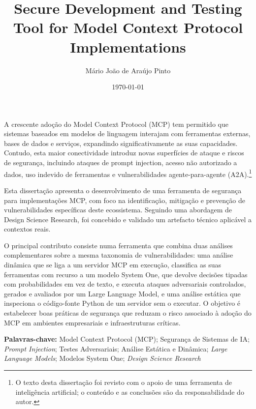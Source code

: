 \documentclass[a4paper,12pt,twoside]{book}
\title{ Secure Development and Testing Tool for Model Context Protocol
Implementations}
\author{Mário João de Araújo Pinto}
\date{\today}
\begin{document}
\maketitle

\begin{resumo}
A crescente adoção do Model Context Protocol (MCP) tem permitido que sistemas baseados em modelos de linguagem interajam com ferramentas externas, bases de dados e serviços, expandindo significativamente as suas capacidades. Contudo, esta maior conectividade introduz novas superfícies de ataque e riscos de segurança, incluindo ataques de prompt injection, acesso não autorizado a dados, uso indevido de ferramentas e vulnerabilidades agente-para-agente (A2A).\footnote{O texto desta dissertação foi revisto com o apoio de uma ferramenta de inteligência artificial; o conteúdo e as conclusões são da responsabilidade do autor.}

Esta dissertação apresenta o desenvolvimento de uma ferramenta de segurança para implementações MCP, com foco na identificação, mitigação e prevenção de vulnerabilidades específicas deste ecossistema. Seguindo uma abordagem de Design Science Research, foi concebido e validado um artefacto técnico aplicável a contextos reais.

O principal contributo consiste numa ferramenta que combina duas análises complementares sobre a mesma taxonomia de vulnerabilidades: uma análise dinâmica que se liga a um servidor MCP em execução, classifica as suas ferramentas com recurso a um modelo System One, que devolve decisões tipadas com probabilidades em vez de texto, e executa ataques adversariais controlados, gerados e avaliados por um Large Language Model, e uma análise estática que inspeciona o código-fonte Python de um servidor sem o executar. O objetivo é estabelecer boas práticas de segurança que reduzam o risco associado à adoção do MCP em ambientes empresariais e infraestruturas críticas.

\vspace{1em}
\noindent\textbf{Palavras-chave:} Model Context Protocol (MCP); Segurança de Sistemas de IA; \textit{Prompt Injection}; Testes Adversariais; Análise Estática e Dinâmica; \textit{Large Language Models}; Modelos System One; \textit{Design Science Research}


\end{resumo}
\end{document}

